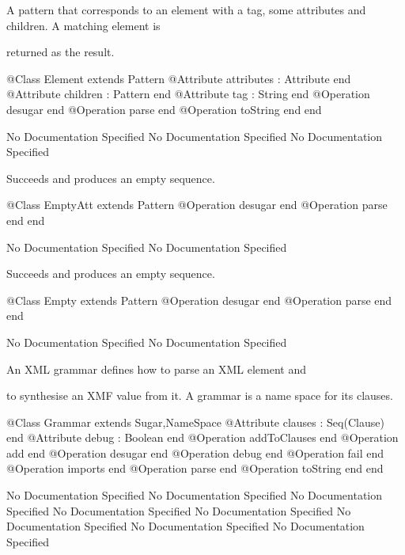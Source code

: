       A pattern that corresponds to an element with a tag,
      some attributes and children. A matching element is

      returned as the result.
\begin{Interface}
@Class Element extends Pattern
  @Attribute attributes : Attribute end
  @Attribute children : Pattern end
  @Attribute tag : String end
  @Operation desugar end
  @Operation parse end
  @Operation toString end
end
\end{Interface}
No Documentation Specified
No Documentation Specified
No Documentation Specified

      Succeeds and produces an empty sequence.
\begin{Interface}
@Class EmptyAtt extends Pattern
  @Operation desugar end
  @Operation parse end
end
\end{Interface}
No Documentation Specified
No Documentation Specified

      Succeeds and produces an empty sequence.
\begin{Interface}
@Class Empty extends Pattern
  @Operation desugar end
  @Operation parse end
end
\end{Interface}
No Documentation Specified
No Documentation Specified

      An XML grammar defines how to parse an XML element and

      to synthesise an XMF value from it. A grammar is a name 
      space for its clauses.
\begin{Interface}
@Class Grammar extends Sugar,NameSpace
  @Attribute clauses : Seq(Clause) end
  @Attribute debug : Boolean end
  @Operation addToClauses end
  @Operation add end
  @Operation desugar end
  @Operation debug end
  @Operation fail end
  @Operation imports end
  @Operation parse end
  @Operation toString end
end
\end{Interface}
No Documentation Specified
No Documentation Specified
No Documentation Specified
No Documentation Specified
No Documentation Specified
No Documentation Specified
No Documentation Specified
No Documentation Specified

